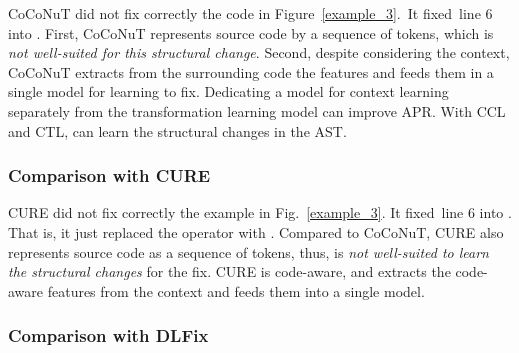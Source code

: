 CoCoNuT did not fix correctly the code in Figure~\ref{example_3}.~It
fixed~line 6 into   
 \code{());}. First, CoCoNuT represents source code by
a sequence of tokens, which is {\em not well-suited for this
  structural change}. Second, despite considering the context, CoCoNuT
extracts from the surrounding code the features and feeds them in a
single model for learning to fix.
%
Dedicating a model for context learning separately
from the transformation learning model can improve APR.
With CCL and CTL, {\tool} can learn the structural changes in the AST.

\subsubsection{\bf Comparison with CURE}



CURE did not fix correctly the example in Fig.~\ref{example_3}. It
fixed~line 6 into 
  \code{/} .
That is, it just replaced the operator \code{\%} with \code{/}.
Compared to CoCoNuT, CURE also represents source code as a sequence of
tokens, thus, is {\em not well-suited to learn the structural changes} for
the fix. CURE is code-aware,
and extracts the code-aware features from the context and feeds them
into a single model.

\subsubsection{\bf Comparison with DLFix}


